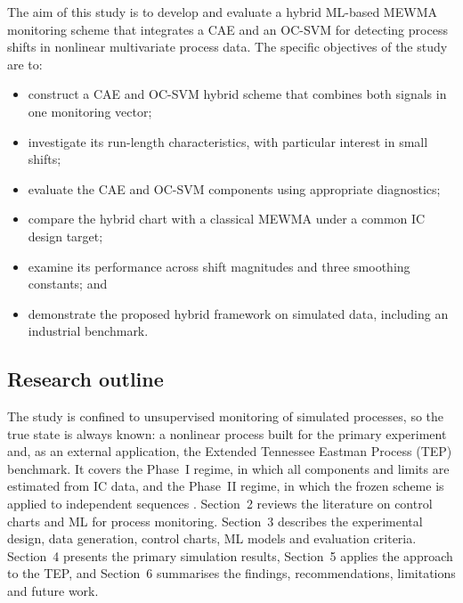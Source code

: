 The aim of this study is to develop and evaluate a hybrid ML-based MEWMA monitoring scheme that integrates a CAE and
an OC-SVM for detecting process shifts in nonlinear multivariate process data. The specific objectives of the study are to:
\begin{itemize}
\item construct a CAE and OC-SVM hybrid scheme that combines both signals in one monitoring vector;
\item investigate its run-length characteristics, with particular interest in small shifts;
\item evaluate the CAE and OC-SVM components using appropriate diagnostics;
\item compare the hybrid chart with a classical MEWMA under a common IC design target;
\item examine its performance across shift magnitudes and three smoothing constants; and
\item demonstrate the proposed hybrid framework on simulated data, including an industrial benchmark.
\end{itemize}

\subsection{Research outline}

The study is confined to unsupervised monitoring of simulated processes, so the true state is always
known: a nonlinear process built for the primary experiment and, as an external application, the
Extended Tennessee Eastman Process (TEP) benchmark. It covers the Phase~I regime, in which all components and limits are estimated from IC data, and the Phase~II regime, in which the frozen scheme is applied to independent sequences
\citep{ahmed_statistical_2017}. Section~2 reviews the literature on control charts and ML for process monitoring. Section~3 describes the experimental design, data generation, control charts, ML models and evaluation criteria. Section~4 presents the primary simulation results, Section~5 applies the approach to the TEP, and Section~6 summarises the findings, recommendations, limitations and future work.
